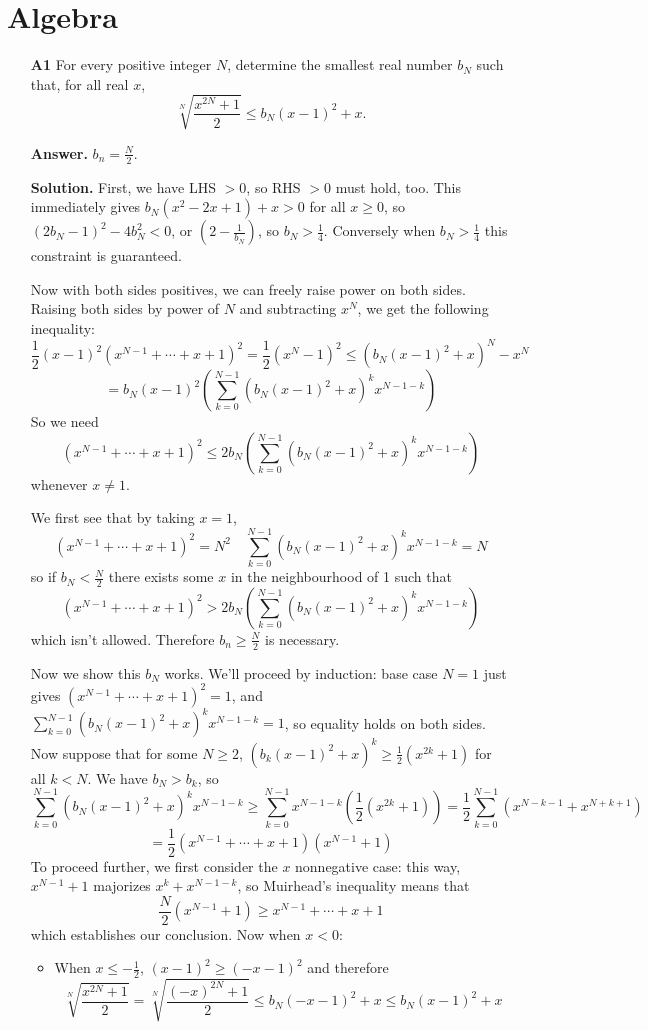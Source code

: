 \documentclass[11pt,a4paper]{article}
\begin{document}
\section*{Algebra}
\begin{enumerate}
	\item [\textbf{A1}]
	For every positive integer $N$, determine the smallest real number $b_{N}$ such that, for all real $x$,
	\[
	\sqrt[N]{\frac{x^{2 N}+1}{2}} \leqslant b_{N}(x-1)^{2}+x .
	\]
	
	\textbf{Answer.} $b_n = \frac{N}{2}$. 
	
	\textbf{Solution.} 
	First, we have LHS $> 0$, so RHS $> 0$ must hold, too. 
	This immediately gives $b_N(x^2-2x+1)+x> 0$ for all $x\ge 0$, 
	so $(2b_N-1)^2-4b_N^2<0$, or $(2-\frac{1}{b_N})$, so $b_N>\frac 14$. 
	Conversely when $b_N>\frac 14$ this constraint is guaranteed. 
	
	Now with both sides positives, we can freely raise power on both sides. 
	Raising both sides by power of $N$ and subtracting $x^N$, we get the following inequality: 
	\[
	\frac 12 (x-1)^2 (x^{N-1}+\cdots + x+1)^2
	=
	\frac{1}{2}(x^N-1)^2\le (b_N(x-1)^2+x)^N-x^N
	\]\[
	=b_N(x-1)^2\left(\sum_{k=0}^{N-1}(b_N(x-1)^2+x)^kx^{N-1-k}\right)
	\]
	So we need 
	\[
	(x^{N-1}+\cdots + x+1)^2
	\le 2b_N\left(\sum_{k=0}^{N-1}(b_N(x-1)^2+x)^kx^{N-1-k}\right)
	\]
	whenever $x\neq 1$. 
	
	We first see that by taking $x=1$, 
	\[
	(x^{N-1}+\cdots + x+1)^2=N^2
	\quad 
	\sum_{k=0}^{N-1}(b_N(x-1)^2+x)^kx^{N-1-k}
	=N
	\]
	so if $b_N<\frac{N}{2}$ there exists some $x$ in the neighbourhood of 1 such that 
	\[
	(x^{N-1}+\cdots + x+1)^2
	> 2b_N\left(\sum_{k=0}^{N-1}(b_N(x-1)^2+x)^kx^{N-1-k}\right)
	\]
	which isn't allowed. Therefore $b_n\ge \frac{N}{2}$ is necessary. 
	
	Now we show this $b_N$ works. 
	We'll proceed by induction: 
	base case $N=1$ just gives $(x^{N-1}+\cdots + x+1)^2=1$, 
	and $\sum_{k=0}^{N-1}(b_N(x-1)^2+x)^kx^{N-1-k}=1$, 
	so equality holds on both sides. 
	Now suppose that  for some $N\ge 2$, 
	$(b_k(x-1)^2+x)^k\ge \frac 12(x^{2k}+1)$ for all $k<N$. 
	We have $b_N>b_k$, so 
	\[
	\sum_{k=0}^{N-1}(b_N(x-1)^2+x)^kx^{N-1-k}
	\ge \sum_{k=0}^{N-1}x^{N-1-k}\left(\frac 12(x^{2k}+1)\right)
	=\frac 12 \sum_{k=0}^{N-1}\left(x^{N-k-1}+x^{N+k+1}\right)
	\]
	\[
	=\frac 12 (x^{N-1}+\cdots + x+1)(x^{N-1}+1)
	\]
	To proceed further, 
	we first consider the $x$ nonnegative case: 
	this way, $x^{N-1}+1$ majorizes $x^{k}+x^{N-1-k}$, 
	so Muirhead's inequality means that 
	\[
	\frac N2(x^{N-1}+1)\ge x^{N-1}+\cdots + x + 1
	\]
	which establishes our conclusion. 
	Now when $x<0$: 
	\begin{itemize}
		\item When $x\le -\frac{1}{2}$, $(x-1)^2\ge (-x-1)^2$ and therefore 
		\[
		\sqrt[N]{\frac{x^{2 N}+1}{2}} 
		=\sqrt[N]{\frac{(-x)^{2 N}+1}{2}} \leq b_{N}(-x-1)^{2}+x 
		\le b_{N}(x-1)^{2}+x 
		\]
		

\end{itemize}
\end{enumerate}
\end{document}
